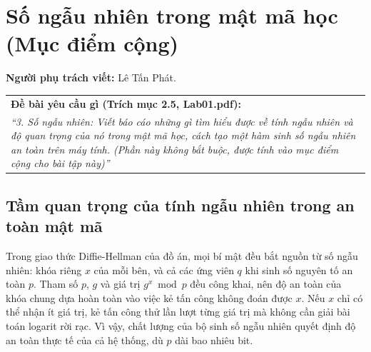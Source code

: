 \section{Số ngẫu nhiên trong mật mã học (Mục điểm cộng)}
\label{sec:so-ngau-nhien}

\noindent\textbf{Người phụ trách viết:} Lê Tấn Phát.

\begin{table}[h!]
\centering
\begin{tabular}{|p{14.5cm}|}
\hline
\textbf{Đề bài yêu cầu gì (Trích mục 2.5, Lab01.pdf):} \\
\textit{``3. Số ngẫu nhiên: Viết báo cáo những gì tìm hiểu được về tính ngẫu nhiên và độ quan trọng của nó trong mật mã học, cách tạo một hàm sinh số ngẫu nhiên an toàn trên máy tính. (Phần này không bắt buộc, được tính vào mục điểm cộng cho bài tập này)''} \\
\hline
\end{tabular}
\end{table}


\subsection{Tầm quan trọng của tính ngẫu nhiên trong an toàn mật mã}

Trong giao thức Diffie-Hellman của đồ án, mọi bí mật đều bắt nguồn từ số ngẫu nhiên: khóa riêng $x$ của mỗi bên, và cả các ứng viên $q$ khi sinh số nguyên tố an toàn $p$. Tham số $p$, $g$ và giá trị $g^x \bmod p$ đều công khai, nên độ an toàn của khóa chung dựa hoàn toàn vào việc kẻ tấn công không đoán được $x$. Nếu $x$ chỉ có thể nhận ít giá trị, kẻ tấn công thử lần lượt từng giá trị mà không cần giải bài toán logarit rời rạc. Vì vậy, chất lượng của bộ sinh số ngẫu nhiên quyết định độ an toàn thực tế của cả hệ thống, dù $p$ dài bao nhiêu bit.


